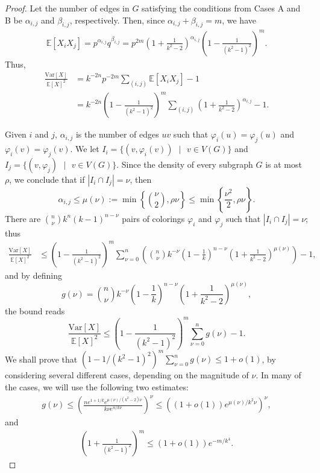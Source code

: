 \documentclass[12pt]{article}
\newcommand{\setdiv}{\text{ }|\text{ }}
\newcommand{\E}{\mathbb{E}}
\renewcommand{\P}{\mathbb{P}}
\newcommand{\Var}{\text{Var}}
\newcommand{\1}{\mathds{1}}
\begin{document}
\begin{proof}
    \newcommand{\al}{\alpha_{i,j}}
    \newcommand{\be}{\beta_{i,j}}
    \newcommand{\ga}{\gamma_{i,j}}
    Let the number of edges in $G$ satisfying the conditions from Cases A and B be $\al$ and $\be$, respectively. Then, since $\al+\be=m$, we have
    \begin{align*}
        \E[X_iX_j] %
        =p^{\al}q^{\be}
        =p^{2m}\left(1+\frac{1}{k^2-2}\right)^{\al}\left(1-\frac{1}{(k^2-1)^2}\right)^{m}.
    \end{align*}
    Thus, 
    \begin{align*}
        \frac{\Var[X]}{\E[X]^2}&=k^{-2n}p^{-2m} \sum_{(i,j)}\E[X_iX_j]-1\\
        &= k^{-2n}\left(1-\frac{1}{(k^2-1)^2}\right)^m\sum_{(i,j)}\left(1+\frac{1}{k^2-2}\right)^{\al}-1.
    \end{align*}

    \vspace{\baselineskip}

    Given $i$ and $j$, $\al$ is the number of edges $uv$ such that $\varphi_i(u)=\varphi_j(u)$ and 
	$\varphi_i(v)=\varphi_j(v)$. %
    We let $I_i=\{(v,\varphi_i(v)) \setdiv v\in V(G) \}$ and $I_j=\{(v,\varphi_j)\setdiv v\in V(G)\}$. 
Since the density of every subgraph $G$ is at most $\rho$, we conclude that if $|I_i\cap I_j|=\nu$, then
    $$\al \le \mu(\nu):=\min \left\{\binom{\nu}{2}, \rho\nu \right\}\leq  \min\left\{\frac{\nu^2}{2},\rho\nu\right\}.$$
There are $\binom{n}{\nu}k^n(k-1)^{n-\nu}$ pairs of colorings $\varphi_i$ and $\varphi_j$ such that $|I_i\cap I_j|=\nu$; thus
    \begin{align*}
        \frac{\Var[X]}{\E[X]^2} &\leq 
\left(1-\frac{1}{(k^2-1)^2}\right)^m\sum_{\nu=0}^n \left( \binom{n}{\nu}k^{-\nu}\left(1-\frac{1}{k}\right)^{n-\nu}\left(1+\frac{1}{k^2-2}\right)^{\mu(\nu)}\right)-1,
    \end{align*}
    and by defining 
    $$
    g(\nu)=\binom{n}{\nu}k^{-\nu}\left(1-\frac{1}{k}\right)^{n-\nu}\left(1+\frac{1}{k^2-2}\right)^{\mu(\nu)},
    $$ 
    the bound reads
    $$ 
    \frac{\Var[X]}{\E[X]^2}\leq \left(1-\frac{1}{(k^2-1)^2}\right)^{m}\sum_{\nu=0}^ng(\nu)-1.
    $$
We shall prove that $(1-1/(k^2-1)^2)^{m}\sum_{\nu=0}^ng(\nu)\leq 1+o(1)$, by considering several different
cases, depending on the magnitude of $\nu$. In many of the cases, we will use the following two estimates:
    \begin{align}
    \label{Equation: Bound on g(nu), simple graphs}
        g(\nu)\leq \left(\frac{ne^{1+1/k}e^{\mu(\nu)/(k^2-2)\nu}}{k\nu e^{n/k\nu}}\right)^\nu\leq \left((1+o(1))e^{\mu(\nu)/k^2\nu}\right)^\nu,
    \end{align}
and    
\begin{align}
    \label{Equation: Bound on (...)^m, simple graphs}
        \left(1+\frac{1}{(k^2-1)^2}\right)^m\leq 
	(1+o(1))e^{-m/k^4}.
    \end{align}


\end{proof}
\end{document}
